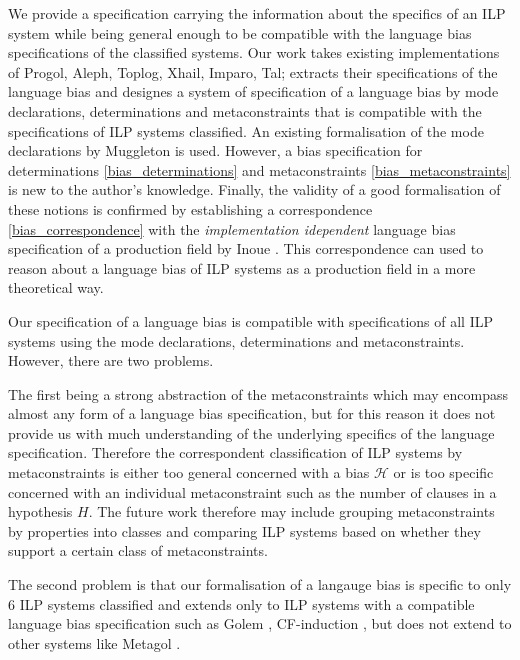 We provide a specification carrying the information about the specifics of an ILP system while being general enough to be compatible with the language bias specifications of the classified systems.
Our work takes existing implementations of Progol, Aleph, Toplog, Xhail, Imparo, Tal; extracts their specifications of the language bias and designes a system of specification of a language bias by mode declarations, determinations and metaconstraints that is compatible with the specifications of ILP systems classified. An existing formalisation of the mode declarations by Muggleton \cite{muggleton1995inverse} is used. However, a bias specification for determinations \ref{bias_determinations} and metaconstraints \ref{bias_metaconstraints} is new to the author's knowledge. Finally, the validity of a good formalisation of these notions is confirmed by establishing a correspondence \ref{bias_correspondence} with the \emph{implementation idependent} language bias specification of a production field by Inoue \cite{inoue1992linear}. This correspondence can used to reason about a language bias of ILP systems as a production field in a more theoretical way.

Our specification of a language bias is compatible with specifications of all ILP systems using the mode declarations, determinations and metaconstraints. However, there are two problems.

The first being a strong abstraction of the metaconstraints which may encompass almost any form of a language bias specification, but for this reason it does not provide us with much understanding of the underlying specifics of the language specification. Therefore the correspondent classification of ILP systems by metaconstraints is either too general concerned with a bias $\mathcal{H}$ or is too specific concerned with an individual metaconstraint such as the number of clauses in a hypothesis $H$. The future work therefore may include grouping metaconstraints by properties into classes and comparing ILP systems based on whether they support a certain class of metaconstraints.

The second problem is that our formalisation of a langauge bias is specific to only 6 ILP systems classified and extends only to ILP systems with a compatible language bias specification such as Golem \cite{muggleton1992efficient}, CF-induction \cite{yamamoto2014cfInductionWebsite}, but does not extend to other systems like Metagol \cite{muggleton2013meta}\cite{muggleton2014meta}.

